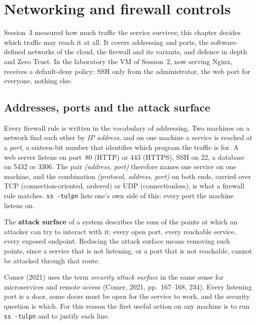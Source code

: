 \chapter{Networking and firewall controls}

Session~3 measured how much traffic the service survives; this chapter
decides which traffic may reach it at all. It covers addressing and ports,
the software-defined networks of the cloud, the firewall and its variants,
and defence in depth and Zero Trust. In the laboratory the VM of Session~2,
now serving Nginx, receives a default-deny policy: SSH only from the
administrator, the web port for everyone, nothing else.

\section{Addresses, ports and the attack surface}

Every firewall rule is written in the vocabulary of addressing. Two
machines on a network find each other by \emph{IP address}, and on one
machine a service is reached at a \emph{port}, a sixteen-bit number that
identifies which program the traffic is for. A web server listens on
port~80 (HTTP) or 443 (HTTPS), SSH on 22, a database on 5432 or 3306. The
pair \emph{(address, port)} therefore names one service on one machine, and
the combination \emph{(protocol, address, port)} on both ends, carried over
TCP (connection-oriented, ordered) or UDP (connectionless), is what a
firewall rule matches. \texttt{ss -tulpn} lists one's own side of this:
every port the machine listens on.

\begin{definition}\label{def:attacksurface}
The \textbf{attack surface} of a system describes the sum of the points at
which an attacker can try to interact with it: every open port, every
reachable service, every exposed endpoint. Reducing the attack surface means
removing such points, since a service that is not listening, or a port that is
not reachable, cannot be attacked through that route.
\end{definition}

Comer (2021) uses the term \emph{security attack surface} in the same sense
for microservices and remote access (Comer, 2021, pp.~167--168, 234). Every
listening port is a door, some doors must be open for the service to work,
and the security question is which. For this reason the first useful action
on any machine is to run \texttt{ss -tulpn} and to justify each line.

